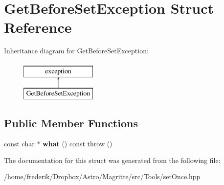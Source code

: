 \hypertarget{structGetBeforeSetException}{}\section{Get\+Before\+Set\+Exception Struct Reference}
\label{structGetBeforeSetException}
Inheritance diagram for Get\+Before\+Set\+Exception\+:\begin{figure}[H]
\begin{center}
\leavevmode
\includegraphics[height=2.000000cm]{structGetBeforeSetException}
\end{center}
\end{figure}
\subsection*{Public Member Functions}
\begin{DoxyCompactItemize}
\item 
\mbox{\label{structGetBeforeSetException_aa0845c7c8351249d9a788b1b928f8ecb}} 
const char $\ast$ {\bfseries what} () const  throw ()
\end{DoxyCompactItemize}


The documentation for this struct was generated from the following file\+:\begin{DoxyCompactItemize}
\item 
/home/frederik/\+Dropbox/\+Astro/\+Magritte/src/\+Tools/set\+Once.\+hpp\end{DoxyCompactItemize}
